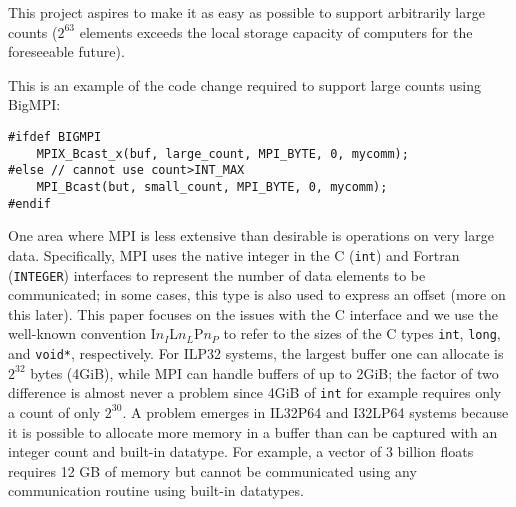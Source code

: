 This project aspires to make it as easy as possible to support arbitrarily
large counts ($2^{63}$ elements exceeds the local storage capacity of computers
for the foreseeable future).

This is an example of the code change required to support large counts using
BigMPI:
\begin{verbatim}
#ifdef BIGMPI
    MPIX_Bcast_x(buf, large_count, MPI_BYTE, 0, mycomm);
#else // cannot use count>INT_MAX
    MPI_Bcast(but, small_count, MPI_BYTE, 0, mycomm);
#endif
\end{verbatim}




One area where MPI is less extensive than desirable is operations on very large data.
Specifically, MPI uses the native integer in the C (\texttt{int}) and Fortran (\texttt{INTEGER})
interfaces to represent the number of data elements to be communicated;
in some cases, this type is also used to express an offset (more on this later).  
This paper focuses on the issues with the C interface and we use the
well-known convention I$n_{I}$L$n_{L}$P$n_{P}$ to refer to the sizes
of the C types \texttt{int}, \texttt{long}, and \texttt{void*}, respectively.
For ILP32 systems, the largest buffer one can allocate is $2^{32}$ bytes (4GiB),
while MPI can handle buffers of up to 2GiB; the factor of two difference is
almost never a problem since 4GiB of \texttt{int} for example requires only
a count of only $2^30$.
A problem emerges in IL32P64 and I32LP64 systems because it is possible to allocate
more memory in a buffer than can be captured with an integer count and built-in datatype.
For example, a vector of 3 billion floats requires 12 GB of memory but cannot be 
communicated using any communication routine using built-in datatypes.

